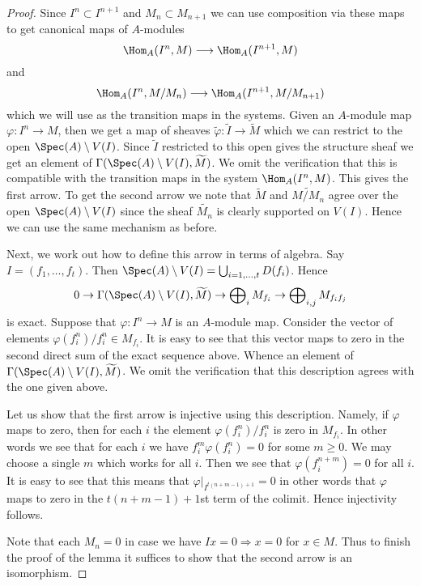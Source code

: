 \begin{proof}
Since $I^n \subset I^{n + 1}$ and $M_n \subset M_{n + 1}$ we can
use composition via these maps to get canonical maps of $A$-modules
$$
\Hom_A(I^n, M)
\longrightarrow
\Hom_A(I^{n + 1}, M)
$$
and
$$
\Hom_A(I^n, M/M_n)
\longrightarrow
\Hom_A(I^{n + 1}, M/M_{n + 1})
$$
which we will use as the transition maps in the systems. Given an
$A$-module map $\varphi : I^n \to M$, then we get a map of
sheaves $\widetilde{\varphi} : \widetilde{I} \to \widetilde{M}$
which we can restrict to the open $\Spec(A) \setminus V(I)$.
Since $\widetilde{I}$ restricted to this open gives the structure
sheaf we get an element of
$\Gamma(\Spec(A) \setminus V(I), \widetilde{M})$.
We omit the verification that this is compatible with the transition maps
in the system $\Hom_A(I^n, M)$. This gives the first arrow.
To get the second arrow we note that
$\widetilde{M}$ and $\widetilde{M/M_n}$ agree over the open
$\Spec(A) \setminus V(I)$ since the sheaf $\widetilde{M_n}$
is clearly supported on $V(I)$. Hence we can use the same mechanism
as before.

\medskip\noindent
Next, we work out how to define this arrow in terms of algebra.
Say $I = (f_1, \ldots, f_t)$. Then
$\Spec(A) \setminus V(I) = \bigcup_{i = 1, \ldots, t} D(f_i)$.
Hence
$$
0 \to
\Gamma(\Spec(A) \setminus V(I), \widetilde{M}) \to
\bigoplus\nolimits_i M_{f_i} \to
\bigoplus\nolimits_{i, j} M_{f_if_j}
$$
is exact. Suppose that $\varphi : I^n \to M$ is an $A$-module map.
Consider the vector of elements $\varphi(f_i^n)/f_i^n \in M_{f_i}$.
It is easy to see that this vector maps to zero in the
second direct sum of the exact sequence above. Whence an element
of $\Gamma(\Spec(A) \setminus V(I), \widetilde{M})$.
We omit the verification that this description agrees with the one
given above.

\medskip\noindent
Let us show that the first arrow is injective using this description.
Namely, if $\varphi$ maps to zero, then for each $i$ the element
$\varphi(f_i^n)/f_i^n$ is zero in $M_{f_i}$. In other words we
see that for each $i$ we have $f_i^m\varphi(f_i^n) = 0$ for some $m \geq 0$.
We may choose a single $m$ which works for all $i$. Then we see that
$\varphi(f_i^{n + m}) = 0$ for all $i$. It is easy to see that
this means that $\varphi|_{I^{t(n + m - 1) + 1}} = 0$ in other
words that $\varphi$ maps to zero in the $t(n + m - 1) + 1$st
term of the colimit. Hence injectivity follows.

\medskip\noindent
Note that each $M_n = 0$ in case we have
$Ix = 0 \Rightarrow x = 0$ for $x \in M$. Thus
to finish the proof of the lemma it suffices to show that
the second arrow is an isomorphism.


\end{proof}
